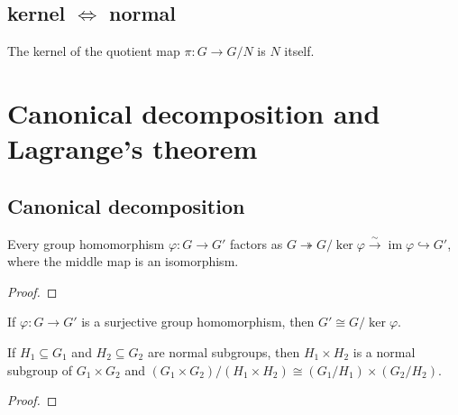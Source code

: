 \subsection{\texorpdfstring{kernel $\Leftrightarrow$ normal}{kernel iff normal}}
\label{subsec:groups:kernel-iff-normal}

\begin{proposition}
  \label{prop:groups:ker-quotientMap}
  The kernel of the quotient map $\pi : G \to G/N$ is $N$ itself.
\end{proposition}

\section{Canonical decomposition and Lagrange's theorem}
\label{sec:groups:canonical-decomposition-and-lagrange-s-theorem}

\subsection{Canonical decomposition}
\label{subsec:groups:canonical-decomposition}

\begin{theorem}
  \label{thm:groups:canonical-decomposition}
  Every group homomorphism $\varphi : G \to G'$ factors as $G
  \twoheadrightarrow G/\ker\varphi \xrightarrow{\sim}
  \operatorname{im}\varphi \hookrightarrow G'$, where the middle map
  is an isomorphism.
\end{theorem}
\begin{proof}
\end{proof}

\begin{corollary}
  \label{coro:groups:first-isomorphism-theorem}
  If $\varphi : G \to G'$ is a surjective group homomorphism, then
  $G' \cong G/\ker\varphi$.
\end{corollary}

\begin{proposition}
  \label{prop:groups:quotient-of-product}
  If $H_1 \subseteq G_1$ and $H_2 \subseteq G_2$ are normal subgroups,
  then $H_1 \times H_2$ is a normal subgroup of $G_1 \times G_2$ and
  $(G_1 \times G_2)/(H_1 \times H_2) \cong (G_1/H_1) \times
  (G_2/H_2)$.
\end{proposition}
\begin{proof}
\end{proof}

